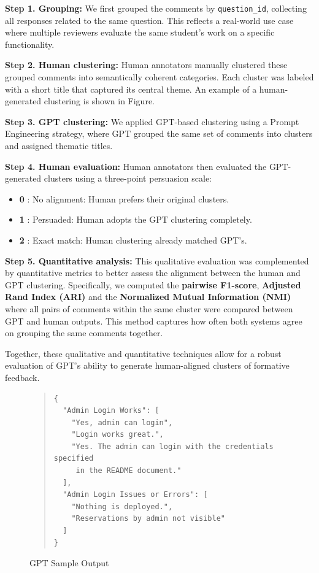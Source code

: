 \documentclass[manuscript,review, anonymous]{acmart}
\begin{document}
\textbf{Step 1. Grouping:} We first grouped the comments by \texttt{question\_id}, collecting all responses related to the same question. This reflects a real-world use case where multiple reviewers evaluate the same student's work on a specific functionality.

\textbf{Step 2. Human clustering:} Human annotators manually clustered these grouped comments into semantically coherent categories. Each cluster was labeled with a short title that captured its central theme. An example of a human-generated clustering is shown in Figure.

\textbf{Step 3. GPT clustering:} We applied GPT-based clustering using a Prompt Engineering strategy, where GPT grouped the same set of comments into clusters and assigned thematic titles. 

\textbf{Step 4. Human evaluation:} Human annotators then evaluated the GPT-generated clusters using a three-point persuasion scale:

\begin{itemize}
    \item \textbf{0} : No alignment: Human prefers their original clusters.
    \item \textbf{1} : Persuaded: Human adopts the GPT clustering completely.
    \item \textbf{2} : Exact match: Human clustering already matched GPT’s.
\end{itemize}

\textbf{Step 5. Quantitative analysis:} This qualitative evaluation was complemented by quantitative metrics to better assess the alignment between the human and GPT clustering. Specifically, we computed the \textbf{pairwise F1-score}, \textbf{Adjusted Rand Index (ARI)} and the \textbf{Normalized Mutual Information (NMI)} where all pairs of comments within the same cluster were compared between GPT and human outputs. This method captures how often both systems agree on grouping the same comments together.

Together, these qualitative and quantitative techniques allow for a robust evaluation of GPT’s ability to generate human-aligned clusters of formative feedback.



\begin{figure}[t]
    \centering
    \begin{minipage}{\linewidth}
        \begin{quote}
        \footnotesize
        \begin{lstlisting}[style=json]
{
  "Admin Login Works": [
    "Yes, admin can login",
    "Login works great.",
    "Yes. The admin can login with the credentials specified 
     in the README document."
  ],
  "Admin Login Issues or Errors": [
    "Nothing is deployed.",
    "Reservations by admin not visible"
  ]
}
        \end{lstlisting}
        \end{quote}
    \end{minipage}
    \caption{GPT Sample Output}
\end{figure}
\end{document}
